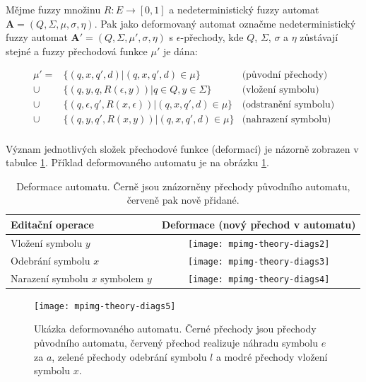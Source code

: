 \begin{definition} \label{def-AutRozpCalL}
 Mějme fuzzy množinu $R: E \rightarrow [0, 1]$ a nedeterministický fuzzy automat $\mathbf{A} = (Q, \Sigma, \mu, \sigma, \eta)$. Pak jako deformovaný automat označme nedeterministický fuzzy automat $\mathbf{A}' = (Q, \Sigma, \mu', \sigma, \eta)$ s $\epsilon$-přechody, kde $Q$, $\Sigma$, $\sigma$ a $\eta$ zůstávají stejné a fuzzy přechodová funkce $\mu'$ je dána:
 
 \begin{align*}
  \mu' = 	& \{ (q, x, q', d) | (q, x, q', d) \in \mu \} 			& \text{(původní přechody)}	\\
    \cup 	& \{ (q, y, q, R(\epsilon, y)) | q \in Q, y \in \Sigma \} 	& \text{(vložení symbolu)}	\\
    \cup 	& \{ (q, \epsilon, q', R(x, \epsilon)) | (q, x, q', d) \in \mu \} & \text{(odstranění symbolu)}	\\
    \cup 	& \{ (q, y, q', R(x, y)) | (q, x, q', d) \in \mu \} 		& \text{(nahrazení symbolu)} \\
  \end{align*}
\end{definition}

Význam jednotlivých složek přechodové funkce (deformací) je názorně zobrazen v tabulce \ref{tbl:DefAutDef}. Příklad deformovaného automatu je na obrázku \ref{img:DefAut}. 

\begin{table}
 \begin{tabular}{|l|c|}
  \hline
  Editační operace 			& Deformace (nový přechod v automatu)	 \\
  \hline
  Vložení symbolu $y$ 			& \texttt{[image: mpimg-theory-diags2]} \\
  \hline
  Odebrání symbolu $x$ 			& \texttt{[image: mpimg-theory-diags3]} \\
  \hline
  Narazení symbolu $x$ symbolem $y$ 	& \texttt{[image: mpimg-theory-diags4]} \\
  \hline
 \end{tabular}
 \caption[Deformace automatu]{Deformace automatu. Černě jsou znázorněny přechody původního automatu, červeně pak nově přidané.} \label{tbl:DefAutDef}
\end{table}

\begin{figure}
  \texttt{[image: mpimg-theory-diags5]}
  \caption[Ukázka deformovaného automatu]{Ukázka deformovaného automatu. Černé přechody jsou přechody původního automatu, červený přechod realizuje náhradu symbolu $e$ za $a$, zelené přechody odebrání symbolu $l$ a modré přechody vložení symbolu $x$.} \label{img:DefAut}
\end{figure}
 
